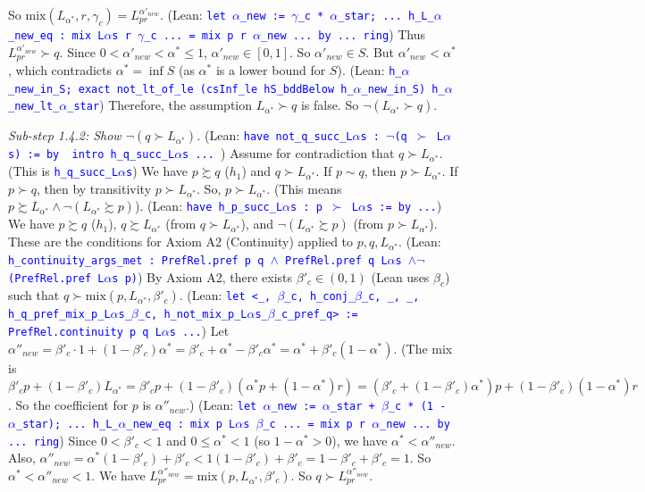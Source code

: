 \documentclass{article}
\theoremstyle{definition}
\newcommand{\tactic}[1]{\textcolor{blue}{\texttt{#1}}}
\newcommand{\pref}{\succsim} %
\newcommand{\strictpref}{\succ} %
\newcommand{\indiff}{\sim} %
\newcommand{\mix}{\mathrm{mix}} %
\begin{document}
    So $\mix(L_{\alpha^*}, r, \gamma_c) = L_{pr}^{\alpha'_{new}}$.
    (Lean: \tactic{let $\alpha$\_new := $\gamma$\_c * $\alpha$\_star; ... h\_L\_$\alpha$\_new\_eq : mix L$\alpha$s r $\gamma$\_c ... = mix p r $\alpha$\_new ... by ... ring})
    Thus $L_{pr}^{\alpha'_{new}} \strictpref q$. Since $0 < \alpha'_{new} < \alpha^* \le 1$, $\alpha'_{new} \in [0,1]$. So $\alpha'_{new} \in S$.
    But $\alpha'_{new} < \alpha^*$, which contradicts $\alpha^* = \inf S$ (as $\alpha^*$ is a lower bound for $S$).
    (Lean: \tactic{h\_$\alpha$\_new\_in\_S; exact not\_lt\_of\_le (csInf\_le hS\_bddBelow h\_$\alpha$\_new\_in\_S) h\_$\alpha$\_new\_lt\_$\alpha$\_star})
    Therefore, the assumption $L_{\alpha^*} \strictpref q$ is false. So $\lnot (L_{\alpha^*} \strictpref q)$.

    \textit{Sub-step 1.4.2: Show $\lnot (q \strictpref L_{\alpha^*})$.}
    (Lean: \tactic{have not\_q\_succ\_L$\alpha$s : $\lnot$(q $\succ$ L$\alpha$s) := by { intro h\_q\_succ\_L$\alpha$s ... }})
    Assume for contradiction that $q \strictpref L_{\alpha^*}$. (This is \tactic{h\_q\_succ\_L$\alpha$s})
    We have $p \pref q$ ($h_1$) and $q \strictpref L_{\alpha^*}$.
    If $p \indiff q$, then $p \strictpref L_{\alpha^*}$. If $p \strictpref q$, then by transitivity $p \strictpref L_{\alpha^*}$.
    So, $p \strictpref L_{\alpha^*}$. (This means $p \pref L_{\alpha^*} \land \lnot(L_{\alpha^*} \pref p)$).
    (Lean: \tactic{have h\_p\_succ\_L$\alpha$s : p $\succ$ L$\alpha$s := by ...})
    We have $p \pref q$ ($h_1$), $q \pref L_{\alpha^*}$ (from $q \strictpref L_{\alpha^*}$), and $\lnot(L_{\alpha^*} \pref p)$ (from $p \strictpref L_{\alpha^*}$).
    These are the conditions for Axiom A2 (Continuity) applied to $p, q, L_{\alpha^*}$.
    (Lean: \tactic{h\_continuity\_args\_met : PrefRel.pref p q $\wedge$ PrefRel.pref q L$\alpha$s $\wedge\lnot$(PrefRel.pref L$\alpha$s p)})
    By Axiom A2, there exists $\beta'_c \in (0,1)$ (Lean uses $\beta_c$) such that $q \strictpref \mix(p, L_{\alpha^*}, \beta'_c)$.
    (Lean: \tactic{let <\_, $\beta$\_c, h\_conj\_$\beta$\_c, \_, \_, h\_q\_pref\_mix\_p\_L$\alpha$s\_$\beta$\_c, h\_not\_mix\_p\_L$\alpha$s\_$\beta$\_c\_pref\_q> := PrefRel.continuity p q L$\alpha$s ...})
    Let $\alpha''_{new} = \beta'_c \cdot 1 + (1-\beta'_c)\alpha^* = \beta'_c + \alpha^* - \beta'_c\alpha^* = \alpha^* + \beta'_c(1-\alpha^*)$.
    (The mix is $\beta'_c p + (1-\beta'_c) L_{\alpha^*} = \beta'_c p + (1-\beta'_c)(\alpha^* p + (1-\alpha^*)r) = (\beta'_c + (1-\beta'_c)\alpha^*)p + (1-\beta'_c)(1-\alpha^*)r$. So the coefficient for $p$ is $\alpha''_{new}$.)
    (Lean: \tactic{let $\alpha$\_new := $\alpha$\_star + $\beta$\_c * (1 - $\alpha$\_star); ... h\_L\_$\alpha$\_new\_eq : mix p L$\alpha$s $\beta$\_c ... = mix p r $\alpha$\_new ... by ... ring})
    Since $0 < \beta'_c < 1$ and $0 \le \alpha^* < 1$ (so $1-\alpha^* > 0$), we have $\alpha^* < \alpha''_{new}$.
    Also, $\alpha''_{new} = \alpha^*(1-\beta'_c) + \beta'_c < 1(1-\beta'_c) + \beta'_c = 1-\beta'_c+\beta'_c = 1$.
    So $\alpha^* < \alpha''_{new} < 1$.
    We have $L_{pr}^{\alpha''_{new}} = \mix(p, L_{\alpha^*}, \beta'_c)$. So $q \strictpref L_{pr}^{\alpha''_{new}}$.
\end{document}
